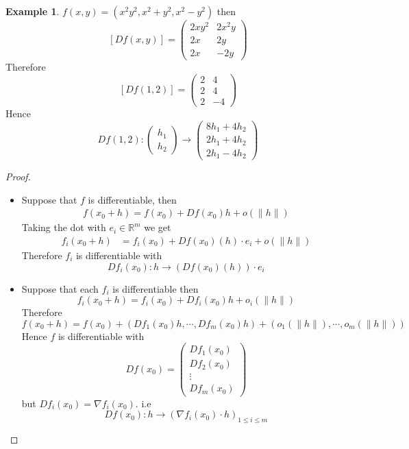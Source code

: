 \documentclass[11pt,a4paper]{article}
\theoremstyle{definition}
\newtheorem{example}[definition]{Example}
\theoremstyle{plain}
\theoremstyle{remark}
\newcommand{\R}{\mathbb{R}}
\newcommand{\norm}[1]{\lVert #1 \rVert}
\begin{document}
\begin{example}
    $f(x,y) = (x^2 y^2, x^2 + y^2, x^2 - y^2)$ then 
    $$[Df(x,y)] = \begin{pmatrix}
        2xy^2 & 2x^2 y \\
        2 x & 2y \\
        2x & -2y
    \end{pmatrix}$$
    Therefore 
    $$[Df(1,2)] = \begin{pmatrix}
        2 & 4 \\
        2 & 4 \\
        2 & -4
    \end{pmatrix}$$
    Hence 
    $$Df(1,2) \colon \begin{pmatrix}
        h_1 \\ h_2
    \end{pmatrix} \to \begin{pmatrix}
        8h_1 + 4h_2 \\
        2 h_1 + 4h_2 \\
        2h_1 - 4h_2
    \end{pmatrix}$$
\end{example}

\begin{proof}
    \begin{itemize}
        \item Suppose that $f$ is differentiable, then 
        \begin{align*}
            f(x_0 + h) = f(x_0) + Df(x_0) h + o(\norm{h}) 
        \end{align*}
        Taking the dot with $e_i \in \R^m$ we get 
        \begin{align*}
            f_i(x_0 + h) &= f_i(x_0) + Df(x_0) (h) \cdot e_i + o(\norm{h})
        \end{align*}
        Therefore $f_i$ is differentiable with 
        $$D f_i (x_0) \colon h \to (Df(x_0) (h)) \cdot e_i$$

        \item Suppose that each $f_i$ is differentiable then 
        $$f_i(x_0 + h) = f_i(x_0) + Df_i(x_0) h + o_i(\norm{h})$$
        Therefore 
        $$f(x_0 + h) = f(x_0) + (Df_1(x_0)h, \cdots, Df_m(x_0) h) + (o_1(\norm{h}), \cdots, o_m(\norm{h}))$$
        Hence $f$ is differentiable with 
        $$Df(x_0) = \begin{pmatrix}
            Df_1(x_0) \\
            Df_2(x_0) \\
            \vdots \\
            Df_m(x_0)
        \end{pmatrix}$$
        but $Df_i(x_0) = \nabla f_i(x_0)$. 
        i.e 
        $$Df(x_0) \colon h \to (\nabla f_i(x_0) \cdot h)_{1 \le i\le m}$$
    \end{itemize}
\end{proof}
\end{document}
